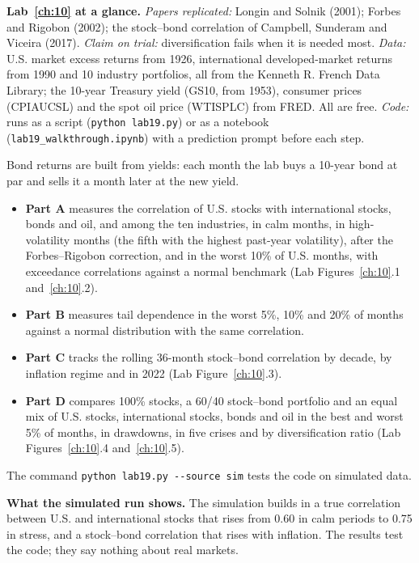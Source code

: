 \begin{callout}
\textbf{Lab~\ref{ch:10} at a glance.} \emph{Papers replicated:} Longin and Solnik (2001); Forbes and Rigobon (2002); the stock--bond correlation of Campbell, Sunderam and Viceira (2017). \emph{Claim on trial:} diversification fails when it is needed most. \emph{Data:} U.S. market excess returns from 1926, international developed-market returns from 1990 and 10 industry portfolios, all from the Kenneth R. French Data Library; the 10-year Treasury yield (GS10, from 1953), consumer prices (CPIAUCSL) and the spot oil price (WTISPLC) from FRED. All are free. \emph{Code:} runs as a script (\texttt{python lab19.py}) or as a notebook (\texttt{lab19\_walkthrough.ipynb}) with a prediction prompt before each step.
\end{callout}

Bond returns are built from yields: each month the lab buys a 10-year bond at par and sells it a month later at the new yield.

\begin{itemize}
  \item \textbf{Part A} measures the correlation of U.S. stocks with international stocks, bonds and oil, and among the ten industries, in calm months, in high-volatility months (the fifth with the highest past-year volatility), after the Forbes--Rigobon correction, and in the worst 10\% of U.S. months, with exceedance correlations against a normal benchmark (Lab Figures~\ref{ch:10}.1 and~\ref{ch:10}.2).
  \item \textbf{Part B} measures tail dependence in the worst 5\%, 10\% and 20\% of months against a normal distribution with the same correlation.
  \item \textbf{Part C} tracks the rolling 36-month stock--bond correlation by decade, by inflation regime and in 2022 (Lab Figure~\ref{ch:10}.3).
  \item \textbf{Part D} compares 100\% stocks, a 60/40 stock--bond portfolio and an equal mix of U.S. stocks, international stocks, bonds and oil in the best and worst 5\% of months, in drawdowns, in five crises and by diversification ratio (Lab Figures~\ref{ch:10}.4 and~\ref{ch:10}.5).
\end{itemize}

The command \texttt{python lab19.py -{}-source sim} tests the code on simulated data.

\textbf{What the simulated run shows.} The simulation builds in a true correlation between U.S. and international stocks that rises from 0.60 in calm periods to 0.75 in stress, and a stock--bond correlation that rises with inflation. The results test the code; they say nothing about real markets.

